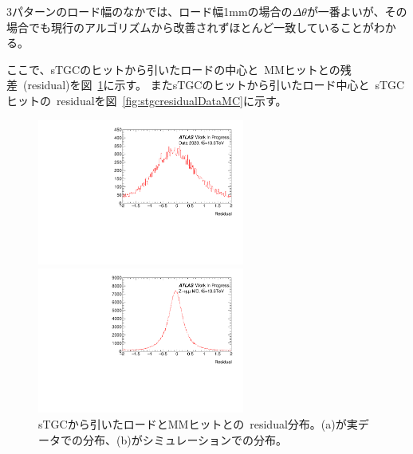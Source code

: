 3パターンのロード幅のなかでは、ロード幅1mmの場合の$\Delta \theta$が一番よいが、その場合でも現行のアルゴリズムから改善されずほとんど一致していることがわかる。

ここで、sTGCのヒットから引いたロードの中心と~MMヒットとの残差~(residual)を図~\ref{fig:mmresidualDataMC}に示す。
またsTGCのヒットから引いたロード中心と~sTGCヒットの~residualを図~\ref{fig:stgcresidualDataMC}に示す。

\begin{figure}[H]
        \begin{minipage}[b]{0.48\linewidth}
            \centering
            \includegraphics[clip, width=6.8cm]{fig/5/residualNewAlg_mm.pdf}
        \end{minipage}
        \begin{minipage}[b]{0.48\linewidth}
            \centering
            \includegraphics[clip, width=6.8cm]{fig/5/residualNewAlg_mm_MC.pdf}
        \end{minipage}
    \caption{sTGCから引いたロードとMMヒットとの~residual分布。(a)が実データでの分布、(b)がシミュレーションでの分布。}
    \label{fig:mmresidualDataMC}
\end{figure}

